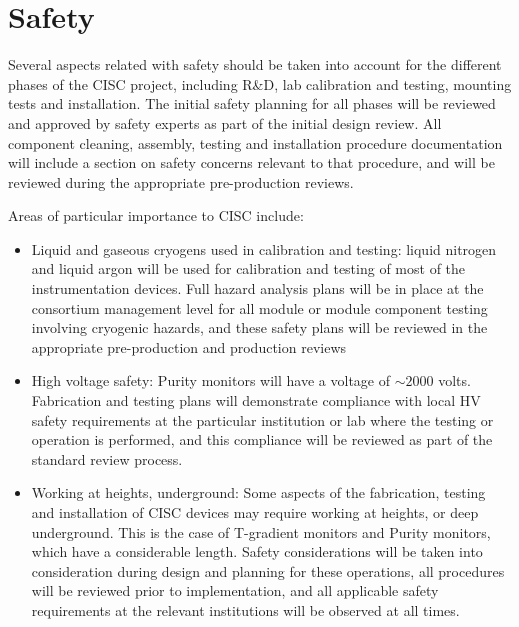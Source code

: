 \section{Safety}
\label{sec:fdgen-slow-cryo-safety}


Several aspects related with safety should be taken into account for the different phases of the CISC project, including R\&D, lab calibration and testing, mounting tests and installation. 
The initial safety planning for all phases will be reviewed and approved by safety experts as part of the initial design review.
All component cleaning, assembly, testing  and installation procedure documentation will include a section on safety concerns
relevant to that procedure, and will be reviewed during the appropriate pre-production reviews.

Areas of particular importance to CISC include:
\begin{itemize}

\item Liquid and gaseous cryogens used in calibration and testing: liquid nitrogen and liquid argon will be used for calibration and testing of most of the instrumentation devices.
  Full hazard analysis plans will be in place at the consortium management level for all module or
  module component testing involving cryogenic hazards, and these safety plans will be reviewed in the appropriate pre-production and production reviews

\item High voltage safety:  Purity monitors will have a voltage of $\sim 2000$ volts. Fabrication and testing plans will demonstrate compliance with local
  HV safety requirements at the particular institution or lab where the testing or operation is performed, and this compliance will be reviewed as part of the standard review process.


\item Working at heights, underground: Some aspects of the fabrication, testing and installation of CISC devices may require working at heights, or deep underground. This is the 
  case of T-gradient monitors and Purity monitors, which have a considerable length.   
  Safety considerations will be taken into consideration during design and planning for these operations, all procedures will be reviewed prior to implementation,
  and all applicable safety requirements at the relevant institutions will be observed at all times.
\end{itemize}
